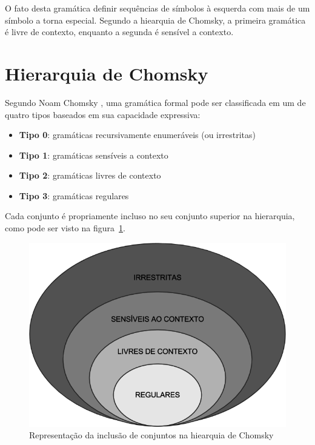 \documentclass[a4paper,12pt,oneside,onecolumn]{uerj}
\begin{document}
O fato desta gramática definir sequências de símbolos à esquerda com mais de um símbolo a torna especial. Segundo a hiearquia de Chomsky, a primeira gramática é livre de contexto, enquanto a segunda é sensível a contexto.

\section{Hierarquia de Chomsky}

Segundo Noam Chomsky \cite{bib:Chomsky57}, uma gramática formal pode ser classificada em um de quatro tipos baseados em sua capacidade expressiva:

\begin{itemize}
    \item {\bf Tipo 0}: gramáticas recursivamente enumeráveis (ou irrestritas)
    \item {\bf Tipo 1}: gramáticas sensíveis a contexto
    \item {\bf Tipo 2}: gramáticas livres de contexto
    \item {\bf Tipo 3}: gramáticas regulares
\end{itemize}

Cada conjunto é propriamente incluso no seu conjunto superior na hierarquia, como pode ser visto na figura~\ref{fig:chomsky}.

\begin{figure}[ht]
  \centering
  \includegraphics[scale=0.5]{figures/chomsky.png}
  \caption{Representação da inclusão de conjuntos na hiearquia de Chomsky}
  \label{fig:chomsky}
\end{figure}
\end{document}
